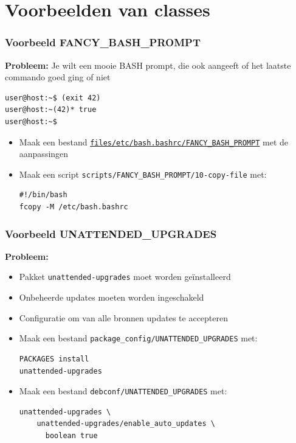 \documentclass{beamer}
\newcommand{\myfaiconfig}{https://github.com/slspeek/fai}
\begin{document}
\section{Voorbeelden van classes}


\begin{frame}[fragile]
\frametitle{Voorbeeld FANCY\_BASH\_PROMPT}
\textbf{Probleem:} 
Je wilt een mooie BASH prompt, die ook aangeeft of het laatste commando goed ging of niet
\begin{verbatim}
user@host:~$ (exit 42)
user@host:~(42)* true
user@host:~$
\end{verbatim}

 

\begin{itemize}
  \item<4-> Maak een bestand \href{\myfaiconfig/blob/main/files/etc/bash.bashrc/FANCY_BASH_PROMPT}{\texttt{files/etc/bash.bashrc/FANCY\_BASH\_PROMPT}} met de aanpassingen
  \item<5-> Maak een script \texttt{scripts/FANCY\_BASH\_PROMPT/10-copy-file} met:
  \begin{verbatim}#!/bin/bash
fcopy -M /etc/bash.bashrc
  \end{verbatim} 
   
\end{itemize}
\end{frame}

\begin{frame}[fragile]
\frametitle{Voorbeeld UNATTENDED\_UPGRADES}
 
\textbf{Probleem:} 
\begin{itemize}
  \item Pakket \texttt{unattended-upgrades} moet worden geïnstalleerd
  \item Onbeheerde updates moeten worden ingeschakeld
  \item Configuratie om van alle bronnen updates te accepteren
\end{itemize}

\begin{itemize}
  \item<2-> Maak een bestand \texttt{package\_config/UNATTENDED\_UPGRADES} met:
  \begin{verbatim}PACKAGES install
unattended-upgrades
  \end{verbatim} 
  \item<3-> Maak een bestand \texttt{debconf/UNATTENDED\_UPGRADES} met:
  \begin{verbatim}unattended-upgrades \
    unattended-upgrades/enable_auto_updates \
      boolean true
  \end{verbatim}
\end{itemize}
\end{frame}
\end{document}
